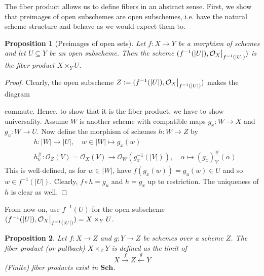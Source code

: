 \documentclass{scrartcl}
\newcommand{\Sch}{\mathrm{\textbf{Sch}}}
\renewcommand{\O}{\mathcal{O}}
\newcommand\restr[2]{{
    \left.\kern-\nulldelimiterspace
    #1
    \vphantom{\big|}
    \right|_{#2}
}}
\newtheorem{prop}{Proposition}[section]
\theoremstyle{definition}
\begin{document}
The fiber product allows us to define fibers in an abstract sense.
First, we show that preimages of open subschemes are open subschemes, i.e. have the natural scheme structure and behave as we would expect them to.
\begin{prop}[Preimages of open sets]
    Let $f: X \to Y$ be a morphism of schemes and let $U \subseteq Y$ be an open subscheme.
    Then the scheme $(f^{-1}(|U|), \restr{\O_X}{f^{-1}(|U|)})$ is the fiber product $X \times_Y U$.
\end{prop}
\begin{proof}
    Clearly, the open subscheme $Z := (f^{-1}(|U|), \restr{\O_X}{f^{-1}(|U|)})$ makes the diagram
    \begin{center}
    \end{center}
    commute.
    Hence, to show that it is the fiber product, we have to show universality.
    Assume $W$ is another scheme with compatible maps $g_x: W \to X$ and $g_u: W \to U$.
    Now define the morphism of schemes $h: W \to Z$ by
    \begin{align*}
        &h: |W| \to |U|, \quad w \in |W| \mapsto g_x(w) \\
        &h^\#_V: \O_Z(V) = \O_X(V) \to \O_W(g_x^{-1}(|V|)), \quad \alpha \mapsto (g_x)^\#_V(\alpha)
    \end{align*}
    This is well-defined, as for $w \in |W|$, have $f(g_x(w)) = g_u(w) \in U$ and so $w \in f^{-1}(|U|)$.
    Clearly, $f \circ h = g_u$ and $h = g_x$ up to restriction.
    The uniqueness of $h$ is clear as well. 
\end{proof}
From now on, use $f^{-1}(U)$ for the open subscheme $(f^{-1}(|U|), \restr{\O_X}{f^{-1}(|U|)}) = X \times_Y U$.
\begin{prop}
    Let $f: X \to Z$ and $g: Y \to Z$ be schemes over a scheme $Z$.
    The fiber product (or pullback) $X \times_Z Y$ is defined as the limit of
    \begin{equation*}
        X \overset{f}{\rightarrow} Z \overset{g}{\leftarrow} Y
    \end{equation*}
    (Finite) fiber products exist in $\Sch$.
\end{prop}
\end{document}
